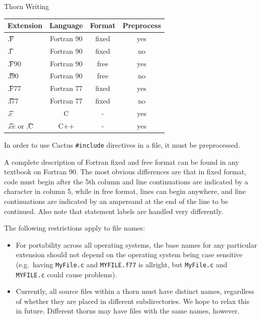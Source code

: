 \begin{cactuspart}{Thorn Writing}
\begin{center}
\begin{tabular}{|l|c|c|c|}
\hline
Extension           & Language   & Format & Preprocess \\
\hline
{\t .F}             & Fortran 90 & fixed  & yes \\
{\t .f}             & Fortran 90 & fixed  & no  \\
{\t .F90}           & Fortran 90 & free   & yes \\
{\t .f90}           & Fortran 90 & free   & no  \\
{\t .F77}           & Fortran 77 & fixed  & yes \\
{\t .f77}           & Fortran 77 & fixed  & no  \\
{\t .c}             & C          & -      & yes \\
{\t .cc} or {\t .C} & C++        & -      & yes \\
\hline
\end{tabular}
\end{center}

In order to use Cactus \texttt{\#include} directives in a file, it must be
preprocessed.

A complete description of Fortran fixed and free format can be found in any
textbook on Fortran 90.  The most obvious differences are that in fixed
format, code must begin after the 5th column and line continuations are
indicated by a character in column 5, while in free format, lines can begin
anywhere, and line continuations are indicated by an ampersand at the end of
the line to be continued.  Also note that statement labels are handled
very differently.

The following restrictions apply to file names:
\begin{itemize}
\item For portability across all operating systems, the base names
        for any particular extension should not depend on the operating
        system being case sensitive (e.g.\ having \texttt{MyFile.c} and
        \texttt{MYFILE.f77} is allright, but \texttt{MyFile.c} and
	\texttt{MYFILE.c} could cause problems).
\item Currently, all source files within a thorn must have distinct names,
regardless of whether they are placed in different subdirectories.  We hope
to relax this in future.  Different thorns may have files with the same names,
however.
\end{itemize}



\end{cactuspart}
